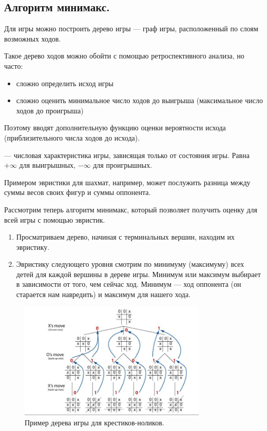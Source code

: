 \subsection{Алгоритм минимакс.}
\begin{remark}
  Для игры можно построить дерево игры --- граф игры, расположенный по слоям возможных ходов.
\end{remark}

Такое дерево ходов можно обойти с помощью ретроспективного анализа, но часто:
\begin{itemize}
  \item сложно определить исход игры
  \item сложно оценить минимальное число ходов до выигрыша (максимальное число ходов до проигрыша)
\end{itemize}

Поэтому вводят дополнительную функцию оценки вероятности исхода (приблизительного числа ходов до исхода).
\begin{definition}
   --- числовая характеристика игры, зависящая только от состояния игры. 
  Равна $+\infty$ для выигрышных, $-\infty$ для проигрышных.
\end{definition}

Примером эвристики для шахмат, например, может послужить разница между суммы весов своих фигур и суммы 
оппонента.

Рассмотрим теперь алгоритм минимакс, который позволяет получить оценку для всей игры с помощью эвристик.

\begin{enumerate}
  \item Просматриваем дерево, начиная с терминальных вершин, находим их эвристику.
  \item Эвристику следующего уровня смотрим по минимуму (максимуму) всех детей для каждой вершины в дереве
    игры. Минимум или максимум выбирает в зависимости от того, чем сейчас ход. Минимум --- ход оппонента 
    (он старается нам навредить) и максимум для нашего хода.
\end{enumerate}

\begin{figure}[H]    
  \centering    
  \includegraphics[width=0.8\textwidth]{figures/minmax.png}    
  \caption*{Пример дерева игры для крестиков-ноликов.}        
\end{figure} 

